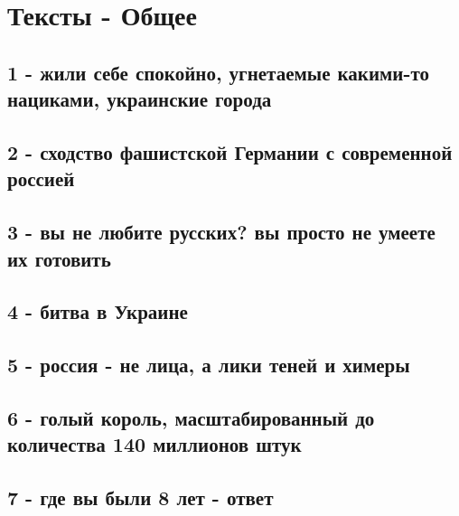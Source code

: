  
 
 
 
 

\section{Тексты - Общее}


\subsection{1 - жили себе спокойно, угнетаемые какими-то нациками, украинские города}

\subsection{2 - сходство фашистской Германии с современной россией}

\subsection{3 - вы не любите русских? вы просто не умеете их готовить}

\subsection{4 - битва в Украине}

\subsection{5 - россия - не лица, а лики теней и химеры}

\subsection{6 - голый король, масштабированный до количества 140 миллионов штук}

\subsection{7 - где вы были 8 лет - ответ}

